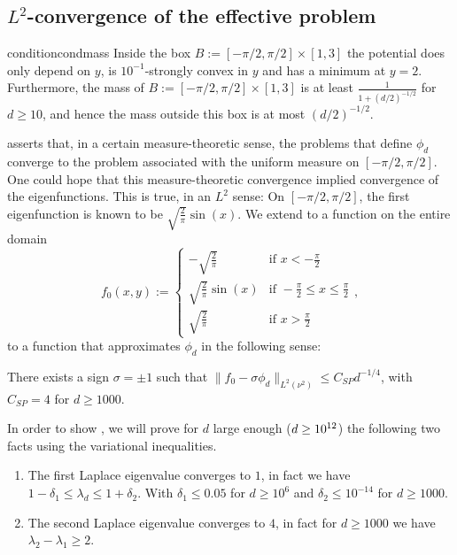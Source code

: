 \subsection{$L^2$-convergence of the effective problem}

\begin{restatable}{condition}{condmass}\label{cond:mass}
Inside the box \( B := [-\pi/2,\pi/2] \times [1,3] \) the potential does only depend on $y$, is $10^{-1}$-strongly convex in $y$ and has a minimum at $y=2$. Furthermore, the mass of \( B := [-\pi/2,\pi/2] \times [1,3] \) is at least \( \frac{1}{1+(d/2)^{-1/2}} \) for \( d \ge 10 \), and hence the mass outside this box is at most \( (d/2)^{-1/2} \). 
\end{restatable}

 asserts that, in a certain measure-theoretic sense, the problems that define $\phi_d$ converge to the problem associated with the uniform measure on $[-\pi/2,\pi/2]$. One could hope that this measure-theoretic convergence implied convergence of the eigenfunctions. This is true, in an $L^2$ sense: On $[-\pi/2,\pi/2]$, the first eigenfunction is known to be $\sqrt{\frac{2}{\pi}}\sin(x)$. We extend to a function on the entire domain
\begin{equation*}
f_0(x,y) :=
\begin{cases}
    -\sqrt{\frac{2}{\pi}} & \text{if } x < -\frac{\pi}{2} \\
    \sqrt{\frac{2}{\pi}}\sin\left(x\right) & \text{if } -\frac{\pi}{2} \le x \le \frac{\pi}{2} \\
    \sqrt{\frac{2}{\pi}} & \text{if } x > \frac{\pi}{2}
\end{cases},
\end{equation*}
to a function that approximates $\phi_d$ in the following sense:

\begin{proposition}\label{prop:stable_poincare_app}
There exists a sign $\sigma = \pm 1$ such that $\|f_0 - \sigma\phi_d\|_{L^2(\nu^2)}\le C_{SP}d^{-1/4}$, with $C_{SP}=4$ for $d \ge 1000$.
\end{proposition}

In order to show , we will prove for $d$ large enough ($d \ge 10^{12}$) the following two facts using the variational inequalities. 

\begin{enumerate}
    \item The first Laplace eigenvalue converges to $1$, in fact we have $1-\delta_1 \le \lambda_d \le 1+\delta_2$. With $\delta_1 \le 0.05$ for $d \ge 10^6$ and $\delta_2 \le 10^{-14}$ for $d \ge 1000$.
    \item The second Laplace eigenvalue converges to $4$, in fact for $d\ge 1000$ we have $\lambda_2-\lambda_1 \ge 2$.
\end{enumerate}


